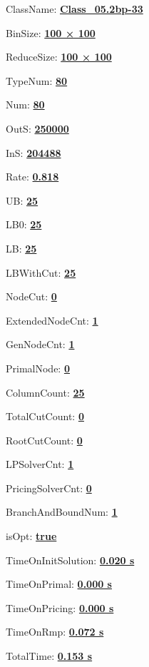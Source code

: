 \documentclass[11pt]{article}
\begin{document}
\pagestyle{empty}


ClassName: \underline{\textbf{Class_05.2bp-33}}
\par
BinSize: \underline{\textbf{100 × 100}}
\par
ReduceSize: \underline{\textbf{100 × 100}}
\par
TypeNum: \underline{\textbf{80}}
\par
Num: \underline{\textbf{80}}
\par
OutS: \underline{\textbf{250000}}
\par
InS: \underline{\textbf{204488}}
\par
Rate: \underline{\textbf{0.818}}
\par
UB: \underline{\textbf{25}}
\par
LB0: \underline{\textbf{25}}
\par
LB: \underline{\textbf{25}}
\par
LBWithCut: \underline{\textbf{25}}
\par
NodeCut: \underline{\textbf{0}}
\par
ExtendedNodeCnt: \underline{\textbf{1}}
\par
GenNodeCnt: \underline{\textbf{1}}
\par
PrimalNode: \underline{\textbf{0}}
\par
ColumnCount: \underline{\textbf{25}}
\par
TotalCutCount: \underline{\textbf{0}}
\par
RootCutCount: \underline{\textbf{0}}
\par
LPSolverCnt: \underline{\textbf{1}}
\par
PricingSolverCnt: \underline{\textbf{0}}
\par
BranchAndBoundNum: \underline{\textbf{1}}
\par
isOpt: \underline{\textbf{true}}
\par
TimeOnInitSolution: \underline{\textbf{0.020 s}}
\par
TimeOnPrimal: \underline{\textbf{0.000 s}}
\par
TimeOnPricing: \underline{\textbf{0.000 s}}
\par
TimeOnRmp: \underline{\textbf{0.072 s}}
\par
TotalTime: \underline{\textbf{0.153 s}}
\par
\newpage


\end{document}
